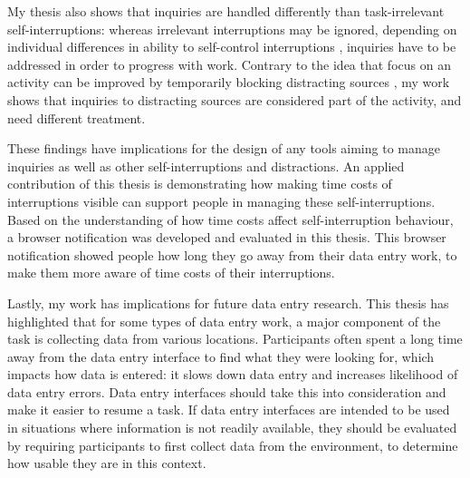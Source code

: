 My thesis also shows that inquiries are handled differently than task-irrelevant self-interruptions: whereas irrelevant interruptions may be ignored, depending on individual differences in ability to self-control interruptions \citep{Lyngs2018}, inquiries have to be addressed in order to progress with work. Contrary to the idea that focus on an activity can be improved by temporarily blocking distracting sources \citep{Kim2017}, my work shows that inquiries to distracting sources are considered part of the activity, and need different treatment. 

These findings have implications for the design of any tools aiming to manage inquiries as well as other self-interruptions and distractions. An applied contribution of this thesis is demonstrating how making time costs of interruptions visible can support people in managing these self-interruptions. Based on the understanding of how time costs affect self-interruption behaviour, a browser notification was developed and evaluated in this thesis. This browser notification showed people how long they go away from their data entry work, to make them more aware of time costs of their interruptions. %

Lastly, my work has implications for future data entry research. This thesis has highlighted that for some types of data entry work, a major component of the task is collecting data from various locations. Participants often spent a long time away from the data entry interface to find what they were looking for, which impacts how data is entered: it slows down data entry and increases likelihood of data entry errors. Data entry interfaces should take this into consideration and make it easier to resume a task. If data entry interfaces are intended to be used in situations where information is not readily available, they should be evaluated by requiring participants to first collect data from the environment, to determine how usable they are in this context. 


